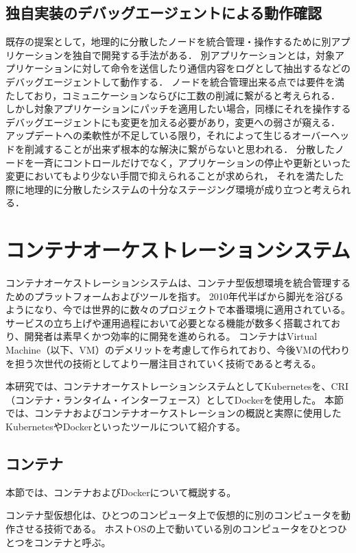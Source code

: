 \subsection{独自実装のデバッグエージェントによる動作確認}
既存の提案として，地理的に分散したノードを統合管理・操作するために別アプリケーションを独自で開発する手法がある．
別アプリケーションとは，対象アプリケーションに対して命令を送信したり通信内容をログとして抽出するなどのデバッグエージェントして動作する．
ノードを統合管理出来る点では要件を満たしており，コミュニケーションならびに工数の削減に繋がると考えられる．
しかし対象アプリケーションにパッチを適用したい場合，同様にそれを操作するデバッグエージェントにも変更を加える必要があり，変更への弱さが窺える．
アップデートへの柔軟性が不足している限り，それによって生じるオーバーヘッドを削減することが出来ず根本的な解決に繋がらないと思われる．
分散したノードを一斉にコントロールだけでなく，アプリケーションの停止や更新といった変更においてもより少ない手間で抑えられることが求められ，
それを満たした際に地理的に分散したシステムの十分なステージング環境が成り立つと考えられる．

\section{コンテナオーケストレーションシステム}

コンテナオーケストレーションシステムは、コンテナ型仮想環境を統合管理するためのプラットフォームおよびツールを指す。
2010年代半ばから脚光を浴びるようになり、今では世界的に数々のプロジェクトで本番環境に適用されている。
サービスの立ち上げや運用過程において必要となる機能が数多く搭載されており、開発者は素早くかつ効率的に開発を進められる。
コンテナはVirtual Machine（以下、VM）のデメリットを考慮して作られており、今後VMの代わりを担う次世代の技術としてより一層注目されていく技術であると考える。

本研究では、コンテナオーケストレーションシステムとしてKubernetesを、CRI（コンテナ・ランタイム・インターフェース）としてDockerを使用した。
本節では、コンテナおよびコンテナオーケストレーションの概説と実際に使用したKubernetesやDockerといったツールについて紹介する。

\subsection{コンテナ}

本節では、コンテナおよびDockerについて概説する。

コンテナ型仮想化は、ひとつのコンピュータ上で仮想的に別のコンピュータを動作させる技術である。
ホストOSの上で動いている別のコンピュータをひとつひとつをコンテナと呼ぶ。

